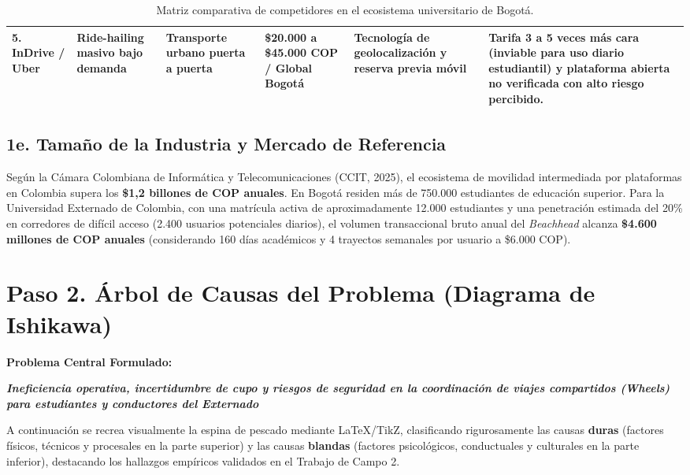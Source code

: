 \documentclass[11pt,a4paper]{article}
\begin{document}
\begin{table}[h!]
\begin{tabularx}{\textwidth}{p{2.3cm}p{2.3cm}p{2.5cm}p{1.8cm}p{2.6cm}X}
\midrule
\textbf{5. InDrive / Uber} & Ride-hailing masivo bajo demanda & Transporte urbano puerta a puerta & \$20.000 a \$45.000 COP / Global Bogot\'a & Tecnolog\'ia de geolocalizaci\'on y reserva previa m\'ovil & Tarifa 3 a 5 veces m\'as cara (inviable para uso diario estudiantil) y plataforma abierta no verificada con alto riesgo percibido. \\
\bottomrule
\end{tabularx}
\caption{Matriz comparativa de competidores en el ecosistema universitario de Bogot\'a.}
\label{tab:competidores}
\end{table}

\subsection{1e. Tama\~no de la Industria y Mercado de Referencia}
Seg\'un la C\'amara Colombiana de Inform\'atica y Telecomunicaciones (CCIT, 2025), el ecosistema de movilidad intermediada por plataformas en Colombia supera los \textbf{\$1,2 billones de COP anuales}. En Bogot\'a residen m\'as de 750.000 estudiantes de educaci\'on superior. Para la Universidad Externado de Colombia, con una matr\'icula activa de aproximadamente 12.000 estudiantes y una penetraci\'on estimada del 20\% en corredores de dif\'icil acceso (2.400 usuarios potenciales diarios), el volumen transaccional bruto anual del \textit{Beachhead} alcanza \textbf{\$4.600 millones de COP anuales} (considerando 160 d\'ias acad\'emicos y 4 trayectos semanales por usuario a \$6.000 COP).

\vspace{0.3cm}

\section{Paso 2. \'Arbol de Causas del Problema (Diagrama de Ishikawa)}

\textbf{Problema Central Formulado:}  
\begin{center}
\textit{\textbf{\Large \color{primary} \guillemotleft Ineficiencia operativa, incertidumbre de cupo y riesgos de seguridad en la coordinaci\'on de viajes compartidos (Wheels) para estudiantes y conductores del Externado\guillemotright}}
\end{center}

A continuaci\'on se recrea visualmente la espina de pescado mediante \LaTeX/TikZ, clasificando rigurosamente las causas \textbf{duras} (factores f\'isicos, t\'ecnicos y procesales en la parte superior) y las causas \textbf{blandas} (factores psicol\'ogicos, conductuales y culturales en la parte inferior), destacando los hallazgos emp\'iricos validados en el Trabajo de Campo 2.
\end{document}
